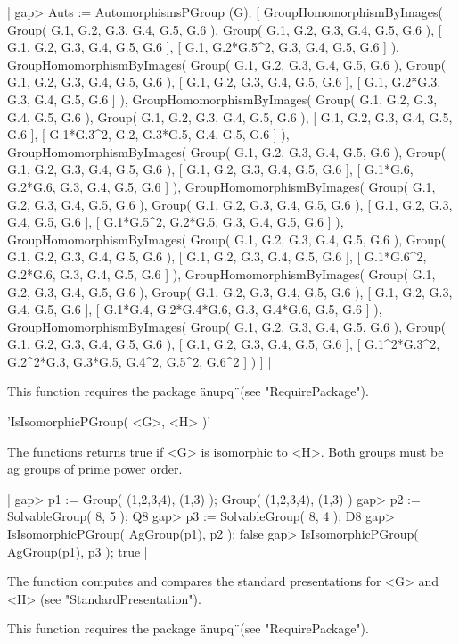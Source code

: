 |    gap> Auts := AutomorphismsPGroup (G);
    [ GroupHomomorphismByImages( Group( G.1, G.2, G.3, G.4, G.5,
        G.6 ), Group( G.1, G.2, G.3, G.4, G.5, G.6 ),
        [ G.1, G.2, G.3, G.4, G.5, G.6 ],
        [ G.1, G.2*G.5^2, G.3, G.4, G.5, G.6 ] ),
      GroupHomomorphismByImages( Group( G.1, G.2, G.3, G.4, G.5,
        G.6 ), Group( G.1, G.2, G.3, G.4, G.5, G.6 ),
        [ G.1, G.2, G.3, G.4, G.5, G.6 ],
        [ G.1, G.2*G.3, G.3, G.4, G.5, G.6 ] ),
      GroupHomomorphismByImages( Group( G.1, G.2, G.3, G.4, G.5,
        G.6 ), Group( G.1, G.2, G.3, G.4, G.5, G.6 ),
        [ G.1, G.2, G.3, G.4, G.5, G.6 ], [ G.1*G.3^2, G.2, G.3*G.5, G.4,
          G.5, G.6 ] ), GroupHomomorphismByImages( Group( G.1, G.2, G.3,
        G.4, G.5, G.6 ), Group( G.1, G.2, G.3, G.4, G.5, G.6 ),
        [ G.1, G.2, G.3, G.4, G.5, G.6 ],
        [ G.1*G.6, G.2*G.6, G.3, G.4, G.5, G.6 ] ),
      GroupHomomorphismByImages( Group( G.1, G.2, G.3, G.4, G.5,
        G.6 ), Group( G.1, G.2, G.3, G.4, G.5, G.6 ),
        [ G.1, G.2, G.3, G.4, G.5, G.6 ], [ G.1*G.5^2, G.2*G.5, G.3, G.4,
          G.5, G.6 ] ), GroupHomomorphismByImages( Group( G.1, G.2, G.3,
        G.4, G.5, G.6 ), Group( G.1, G.2, G.3, G.4, G.5, G.6 ),
        [ G.1, G.2, G.3, G.4, G.5, G.6 ], [ G.1*G.6^2, G.2*G.6, G.3, G.4,
          G.5, G.6 ] ), GroupHomomorphismByImages( Group( G.1, G.2, G.3,
        G.4, G.5, G.6 ), Group( G.1, G.2, G.3, G.4, G.5, G.6 ),
        [ G.1, G.2, G.3, G.4, G.5, G.6 ],
        [ G.1*G.4, G.2*G.4*G.6, G.3, G.4*G.6, G.5, G.6 ] ),
      GroupHomomorphismByImages( Group( G.1, G.2, G.3, G.4, G.5,
        G.6 ), Group( G.1, G.2, G.3, G.4, G.5, G.6 ),
        [ G.1, G.2, G.3, G.4, G.5, G.6 ],
        [ G.1^2*G.3^2, G.2^2*G.3, G.3*G.5, G.4^2, G.5^2, G.6^2 ] ) ] |

This function requires the package \"anupq\"\ (see "RequirePackage").


'IsIsomorphicPGroup( <G>, <H> )'

The functions returns true if <G> is isomorphic to <H>.  Both groups must
be ag groups of prime power order.

|    gap> p1 := Group( (1,2,3,4), (1,3) );
    Group( (1,2,3,4), (1,3) )
    gap> p2 := SolvableGroup( 8, 5 );
    Q8
    gap> p3 := SolvableGroup( 8, 4 );
    D8
    gap> IsIsomorphicPGroup( AgGroup(p1), p2 );
    false
    gap> IsIsomorphicPGroup( AgGroup(p1), p3 );
    true |

The function computes and compares the standard presentations for <G> and
<H> (see "StandardPresentation").

This function requires the package \"anupq\"\ (see "RequirePackage").

